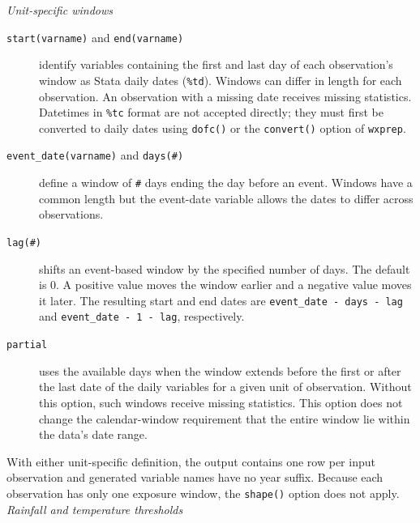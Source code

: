 \noindent\textit{Unit-specific windows}

\begin{description}
	\item[\texttt{start(varname)} and \texttt{end(varname)}] identify variables containing the first and last day of each observation's window as Stata daily dates (\texttt{\%td}). Windows can differ in length for each observation. An observation with a missing date receives missing statistics. Datetimes in \texttt{\%tc} format are not accepted directly; they must first be converted to daily dates using \texttt{dofc()} or the \texttt{convert()} option of \texttt{wxprep}.
	\item[\texttt{event\_date(varname)} and \texttt{days(\#)}] define a window of \texttt{\#} days ending the day before an event. Windows have a common length but the event-date variable allows the dates to differ across observations.
	\item[\texttt{lag(\#)}] shifts an event-based window by the specified number of days. The default is 0. A positive value moves the window earlier and a negative value moves it later. The resulting start and end dates are \texttt{event\_date - days - lag} and \texttt{event\_date - 1 - lag}, respectively.
	\item[\texttt{partial}] uses the available days when the window extends before the first or after the last date of the daily variables for a given unit of observation. Without this option, such windows receive missing statistics. This option does not change the calendar-window requirement that the entire window lie within the data's date range.
\end{description}

\noindent With either unit-specific definition, the output contains one row per input observation and generated variable names have no year suffix. Because each observation has only one exposure window, the \texttt{shape()} option does not apply. \\

\noindent\textit{Rainfall and temperature thresholds}

